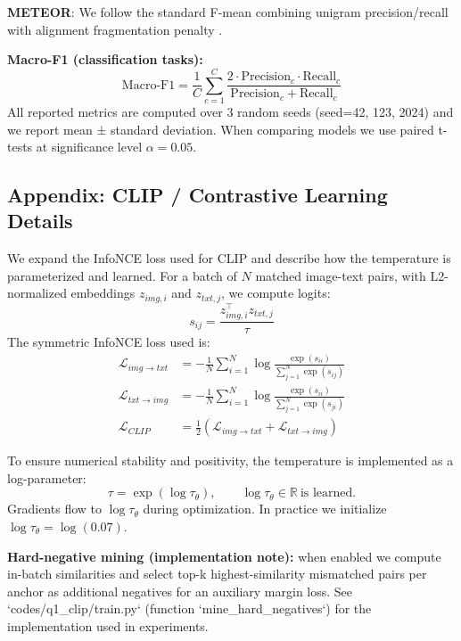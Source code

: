 \documentclass[conference]{IEEEtran}
\begin{document}
\textbf{METEOR}: We follow the standard F-mean combining unigram precision/recall with alignment fragmentation penalty \cite{banerjee2005meteor}.

\textbf{Macro-F1 (classification tasks):}
\begin{equation}
\text{Macro-F1} = \frac{1}{C} \sum_{c=1}^{C} \frac{2 \cdot \text{Precision}_c \cdot \text{Recall}_c}{\text{Precision}_c + \text{Recall}_c}
\end{equation}
All reported metrics are computed over 3 random seeds (seed=42, 123, 2024) and we report mean ± standard deviation. When comparing models we use paired t-tests at significance level \(\alpha=0.05\).

\subsection{Appendix: CLIP / Contrastive Learning Details}\label{appendix:clipdetails}
We expand the InfoNCE loss used for CLIP and describe how the temperature is parameterized and learned. For a batch of \(N\) matched image-text pairs, with L2-normalized embeddings \(z_{img,i}\) and \(z_{txt,j}\), we compute logits:
\begin{equation}
s_{ij} = \frac{z_{img,i}^\top z_{txt,j}}{\tau}
\end{equation}
The symmetric InfoNCE loss used is:
\begin{align}
\mathcal{L}_{img\to txt} &= -\frac{1}{N}\sum_{i=1}^N \log\frac{\exp(s_{ii})}{\sum_{j=1}^N \exp(s_{ij})} \\
\mathcal{L}_{txt\to img} &= -\frac{1}{N}\sum_{i=1}^N \log\frac{\exp(s_{ii})}{\sum_{j=1}^N \exp(s_{ji})} \\
\mathcal{L}_{CLIP} &= \frac{1}{2}(\mathcal{L}_{img\to txt} + \mathcal{L}_{txt\to img})
\end{align}

To ensure numerical stability and positivity, the temperature is implemented as a log-parameter:
\begin{equation}
\tau = \exp(\log\tau_\theta),\qquad \log\tau_\theta \in \mathbb{R}\ \text{is learned.}
\end{equation}
Gradients flow to \(\log\tau_\theta\) during optimization. In practice we initialize \(\log\tau_\theta=\log(0.07)\).

\textbf{Hard-negative mining (implementation note):} when enabled we compute in-batch similarities and select top-k highest-similarity mismatched pairs per anchor as additional negatives for an auxiliary margin loss. See `codes/q1_clip/train.py` (function `mine_hard_negatives`) for the implementation used in experiments.
\end{document}
